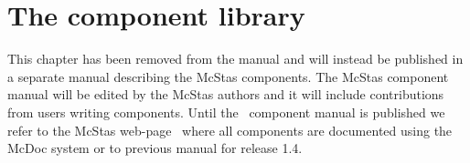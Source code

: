 
\chapter{The component library}
\label{s:components}

This chapter has been removed from the manual and will instead be published 
in a separate manual describing the McStas components. The McStas component manual will be edited by the McStas authors and it will include contributions from users writing components. Until the \MCS\ component manual is published we refer to the McStas web-page~\cite{mcstas_webpage} where all components are documented using the McDoc system or to previous manual for 
release 1.4.
